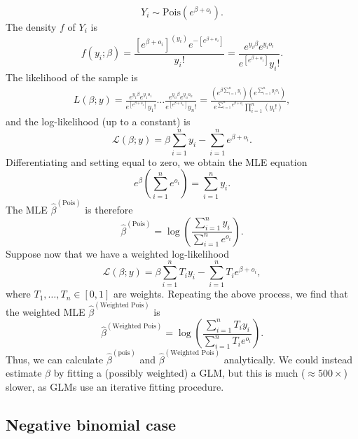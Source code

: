 \documentclass[12pt]{article}
\begin{document}
$$Y_i \sim \textrm{Pois}( e^{ \beta + o_i } ).$$ The density $f$ of $Y_i$ is $$ f(y_i; \beta) =  \frac{\left[ e^{\beta + o_i}  \right]^{(y_i)} e ^{ - \left[ e^{\beta + o_i}  \right] }}{ y_i! } = \frac{ e^{y_i\beta} e^{y_i o_i}   }{ e^{\left[ e^{\beta + o_i} \right]} y_i! }.$$ The likelihood of the sample is
\begin{multline*}
L( \beta; y ) = \frac{ e^{ y_1 \beta } e^{ y_1 o_1}}{ e^{ \left[ e^{ \beta + o_1 } \right] } y_1! } \dots \frac{ e^{ y_n \beta } e^{ y_n o_n}}{ e^{ \left[ e^{ \beta + o_n } \right] } y_n! }  = \frac{ \left( e^{ \beta \sum_{i=1}^n y_i} \right) \left(e^{ \sum_{i=1}^n y_io_i} \right)}{ e^{ \sum_{i=1}^n e^{\beta + o_i}}  \prod_{i=1}^n \left( y_i! \right) },
\end{multline*}
and the log-likelihood (up to a constant) is
$$ \mathcal{L}(\beta; y) = \beta \sum_{i=1}^n y_i -\sum_{i=1}^n e^{\beta + o_i}.$$ Differentiating and setting equal to zero, we obtain the MLE equation
\begin{equation}\label{pois_mle_eq}
e^\beta \left( \sum_{i=1}^n e^{o_i} \right) = \sum_{i=1}^n y_i.
\end{equation}
The MLE $\hat{\beta}^{(\textrm{Pois})}$ is therefore
$$ \hat{\beta}^{(\textrm{Pois})} = \log \left( \frac{ \sum_{i=1}^n y_i }{ \sum_{i=1}^n e^{o_i} } \right).$$
Suppose now that we have a weighted log-likelihood
$$  \mathcal{L}(\beta; y) = \beta \sum_{i=1}^n T_i y_i -\sum_{i=1}^n T_i e^{\beta + o_i},$$ where $T_1, \dots, T_n \in [0,1]$ are weights. Repeating the above process, we find that the weighted MLE $\hat{\beta}^{(\textrm{Weighted Pois})}$ is
$$\hat{\beta}^{(\textrm{Weighted Pois})} = \log \left( \frac{ \sum_{i=1}^n T_i y_i }{ \sum_{i=1}^n T_i e^{o_i} } \right) .$$
Thus, we can calculate $\hat{\beta}^{(\textrm{pois})}$ and $\hat{\beta}^{(\textrm{Weighted Pois})}$ analytically. We could instead estimate $\beta$ by fitting a (possibly weighted) a GLM, but this is much ($\approx500 \times$) slower, as GLMs use an iterative fitting procedure.

\subsection{Negative binomial case}
\end{document}
